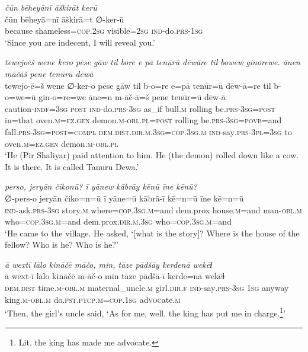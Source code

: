 \ea \label{ŽP.199}
\textit{čūn bēheyānī āškirāt kerū} \\ 
\gll čūn bēheyā=nī āškirā=t ∅-ker-ū \\ 
 because shameless\textsc{=cop}\textsc{.\textsc{2sg}} visible\textsc{=\textsc{2sg}} \textsc{ind-}do\textsc{.prs}\textsc{-\textsc{1sg}} \\ 
\glt `Since you are indecent, I will reveal you.'
\z 
 
\ea \label{ŽP.200}
\textit{tewejoēš wene kero pēse gāw til bore e pā tenūrū dēwāre til bowew ginorewe. ānen māčāš pene tenūrū dēwā} \\ 
\gll tewejo-ē=š wene ∅-ker-o pēse gāw til b-o=re e=pā tenūr=ū dēw-ā=re til b-o=we=ū gin-o=re=we āne=n m-āč-ā=š pene tenūr=ū dēw-ā \\ 
 caution\textsc{-indf}\textsc{=3sg} \textsc{post} \textsc{ind-}do\textsc{.prs}\textsc{-3sg} as\_if bull\textsc{.m} rolling be\textsc{.prs}\textsc{-3sg}\textsc{=\textsc{post}} in=that oven\textsc{.m}\textsc{\textsc{=ez.gen}} demon\textsc{.m}\textsc{-obl}\textsc{.pl}\textsc{=\textsc{post}} rolling be\textsc{.prs}\textsc{-3sg}\textsc{=\textsc{povb}}=and fall\textsc{.prs}\textsc{-3sg}\textsc{=\textsc{post}}\textsc{=compl} \textsc{dem.dist}\textsc{.dir}\textsc{.m}\textsc{.3sg}\textsc{=cop}\textsc{.3sg}\textsc{.m} \textsc{ind-}say\textsc{.prs}\textsc{-3pl}\textsc{=3sg} to oven\textsc{.m}\textsc{\textsc{=ez.gen}} demon\textsc{.m}\textsc{-obl}\textsc{.pl} \\ 
\glt `He (Pir Shaliyar) paid attention to him. He (the demon) rolled down like a cow. It is there. It is called Tanuru Dewa.'
\z 
 
\ea \label{ŽP.204}
\textit{perso, jeryān čikonū? ī yānew kābrāy kēnū īne kēnū?} \\ 
\gll ∅-pers-o jeryān čiko=n=ū ī yāne=ū kābrā-ī kē=n=ū īne kē=n=ū \\ 
 \textsc{ind-}ask\textsc{.prs}\textsc{-3sg} story\textsc{.m} where\textsc{=cop}\textsc{.3sg}\textsc{.m}=and dem.prox house\textsc{.m}=and man\textsc{-obl}\textsc{.m} who\textsc{=cop}\textsc{.3sg}\textsc{.m}=and dem.prox\textsc{.dir}\textsc{.m}\textsc{.3sg} who\textsc{=cop}\textsc{.3sg}\textsc{.m}=and \\ 
\glt `He came to the village. He asked, ‘[what is the story]? Where is the house of the fellow? Who is he? Who is he?'
\z 
 
\ea \label{ŽP.206}
\textit{ā wextī lālo kināčē māčo, min, tāze pādšāy kerdenā wekēɫ} \\ 
\gll ā wext-ī lālo kināčē m-āč-o min tāze pādšā-ī kerde=nā wekēɫ \\ 
 \textsc{dem.dist} time\textsc{.m}\textsc{-obl}\textsc{.m} maternal\_uncle\textsc{.m} girl\textsc{.dir}\textsc{.f} \textsc{ind-}say\textsc{.prs}\textsc{-3sg} \textsc{1sg} anyway king\textsc{.m}\textsc{-obl}\textsc{.m} do\textsc{.pst}\textsc{.ptcp}\textsc{.m}\textsc{=cop}\textsc{.\textsc{1sg}} ad\textsc{voc}ate\textsc{.m} \\ 
\glt `Then, the girl’s uncle said, ‘As for me, well, the king has put me in charge.\footnote{Lit. the king has made me advocate.}'
\z 
 
